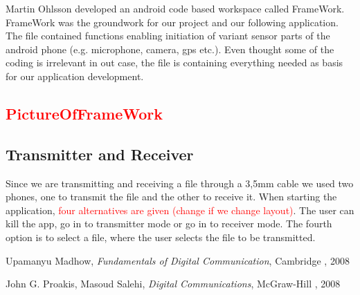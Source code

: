 \documentclass[12pt,a4paper,openright]{article}
\begin{document}
Martin Ohlsson developed an android code based workspace called FrameWork. FrameWork was the groundwork for our project and our following application. The file contained functions enabling initiation of variant sensor parts of the android phone (e.g. microphone, camera, gps etc.). Even thought some of the coding is irrelevant in out case, the file is containing everything needed as basis for our application development.
 \textcolor{red}{\subsection{PictureOfFrameWork}}

\subsection{Transmitter and Receiver}

Since we are transmitting and receiving a file through a 3,5mm cable we used two phones, one to transmit the file and the other to receive it. When starting the application, \textcolor{red}{four alternatives are given (change if we change layout)}. The user can kill the app, go in to transmitter mode or go in to receiver mode. The fourth option is to select a file, where the user selects the file to be transmitted. 


\clearpage

\begin{thebibliography}{1}

Upamanyu Madhow, \emph{Fundamentals of Digital Communication}, Cambridge , 2008

John G. Proakis, Masoud Salehi, \emph{Digital Communications}, McGraw-Hill , 2008

\end{thebibliography}
\end{document}

